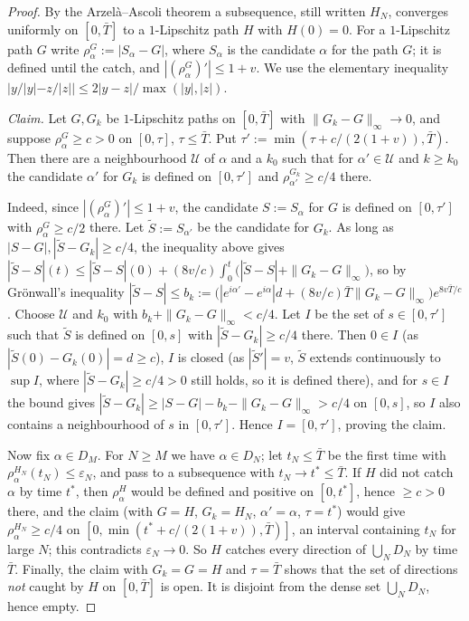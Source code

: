 \begin{proof}
By the Arzel\`a--Ascoli theorem a subsequence, still written $H_N$, converges uniformly on $[0,\bar T]$ to a
$1$-Lipschitz path $H$ with $H(0)=0$. For a $1$-Lipschitz path $G$ write $\rho^G_\alpha:=|S_\alpha-G|$, where $S_\alpha$ is
the candidate $\alpha$ for the path $G$; it is defined until the catch, and $|(\rho^G_\alpha)'|\le1+v$. We use the
elementary inequality $|y/|y|-z/|z||\le2|y-z|/\max(|y|,|z|)$.

\emph{Claim.} Let $G,G_k$ be $1$-Lipschitz paths on $[0,\bar T]$ with $\|G_k-G\|_\infty\to0$, and suppose
$\rho^G_\alpha\ge c>0$ on $[0,\tau]$, $\tau\le\bar T$. Put $\tau':=\min(\tau+c/(2(1+v)),\bar T)$. Then there are a
neighbourhood $\mathcal U$ of $\alpha$ and a $k_0$ such that for $\alpha'\in\mathcal U$ and $k\ge k_0$ the candidate
$\alpha'$ for $G_k$ is defined on $[0,\tau']$ and $\rho^{G_k}_{\alpha'}\ge c/4$ there.

Indeed, since $|(\rho^G_\alpha)'|\le1+v$, the candidate $S:=S_\alpha$ for $G$ is defined on $[0,\tau']$ with
$\rho^G_\alpha\ge c/2$ there. Let $\tilde S:=S_{\alpha'}$ be the candidate for $G_k$. As long as
$|S-G|,|\tilde S-G_k|\ge c/4$, the inequality above gives
$|\tilde S-S|(t)\le|\tilde S-S|(0)+(8v/c)\int_0^t\bigl(|\tilde S-S|+\|G_k-G\|_\infty\bigr)$, so by Gr\"onwall's
inequality $|\tilde S-S|\le b_k:=\bigl(|e^{i\alpha'}-e^{i\alpha}|d+(8v/c)\bar T\|G_k-G\|_\infty\bigr)e^{8v\bar T/c}$.
Choose $\mathcal U$ and $k_0$ with $b_k+\|G_k-G\|_\infty<c/4$. Let $I$ be the set of $s\in[0,\tau']$ such that $\tilde S$
is defined on $[0,s]$ with $|\tilde S-G_k|\ge c/4$ there. Then $0\in I$ (as $|\tilde S(0)-G_k(0)|=d\ge c$), $I$ is
closed (as $|\tilde S'|=v$, $\tilde S$ extends continuously to $\sup I$, where $|\tilde S-G_k|\ge c/4>0$ still holds,
so it is defined there), and for $s\in I$ the bound gives $|\tilde S-G_k|\ge|S-G|-b_k-\|G_k-G\|_\infty>c/4$ on $[0,s]$, so $I$ also
contains a neighbourhood of $s$ in $[0,\tau']$. Hence $I=[0,\tau']$, proving the claim.

Now fix $\alpha\in D_M$. For $N\ge M$ we have $\alpha\in D_N$; let $t_N\le\bar T$ be the first time with
$\rho^{H_N}_\alpha(t_N)\le\varepsilon_N$, and pass to a subsequence with $t_N\to t^*\le\bar T$. If $H$ did not catch
$\alpha$ by time $t^*$, then $\rho^H_\alpha$ would be defined and positive on $[0,t^*]$, hence $\ge c>0$ there, and
the claim (with $G=H$, $G_k=H_N$, $\alpha'=\alpha$, $\tau=t^*$) would give $\rho^{H_N}_\alpha\ge c/4$ on
$[0,\min(t^*+c/(2(1+v)),\bar T)]$, an interval containing $t_N$ for large $N$; this contradicts $\varepsilon_N\to0$.
So $H$ catches every direction of $\bigcup_ND_N$ by time $\bar T$. Finally, the claim with $G_k=G=H$ and $\tau=\bar T$
shows that the set of directions \emph{not} caught by $H$ on $[0,\bar T]$ is open. It is disjoint from the dense set
$\bigcup_ND_N$, hence empty.
\end{proof}

